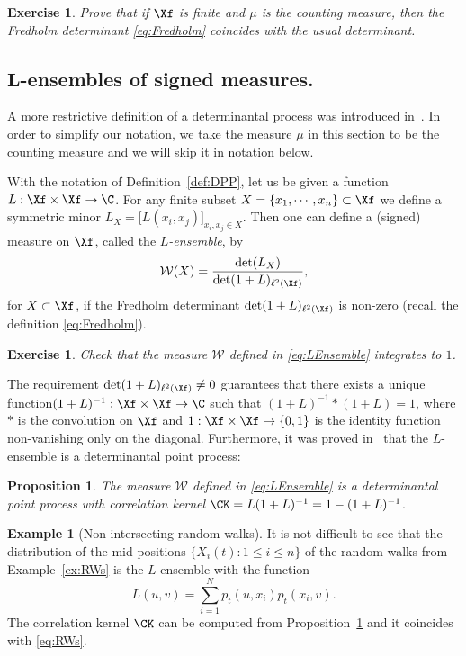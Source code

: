 \documentclass[]{pcmi}
\theoremstyle{plain}
\newtheorem{proposition}[equation]{Proposition}
\newtheorem{exercise}[equation]{Exercise}
\theoremstyle{definition}
\newtheorem{example}[equation]{Example}
\begin{document}
\begin{exercise}
 Prove that if $\Xf$ is finite and $\mu$ is the counting measure, then the Fredholm determinant \eqref{eq:Fredholm} coincides with the usual determinant.
\end{exercise}

\subsection{$\mathbf L$-ensembles of signed measures.}

A more restrictive definition of a determinantal process was introduced in~\cite{borodinRains}. In order to simplify our notation, we take the measure $\mu$ in this section to be the counting measure and we will skip it in notation below.

With the notation of Definition~\ref{def:DPP}, let us be given a function $L:\Xf\times\Xf\to\C$. For any finite subset $X = \{x_1, \cdots, x_n\} \subset \Xf$ we define a symmetric minor $L_X = \bigl[L(x_i,x_j)\bigr]_{x_i,x_j \in X}$. Then one can define a (signed) measure on $\Xf$, called the \emph{$L$-ensemble}, by
\begin{equation}\label{eq:LEnsemble}
\mathcal{W}(X)=\frac{\det(L_X)}{\det(1+L)_{\ell^2(\Xf)}},
\end{equation}
for $X \subset \Xf$, if the Fredholm determinant $\det(1+L)_{\ell^2(\Xf)}$ is non-zero (recall the definition \eqref{eq:Fredholm}).

\begin{exercise}
 Check that the measure $\mathcal{W}$ defined in \eqref{eq:LEnsemble} integrates to $1$.
\end{exercise}

The requirement $\det(1+L)_{\ell^2(\Xf)} \neq 0$ guarantees that there exists a unique function\break$(1+L)^{-1} : \Xf \times \Xf \to \C$ such that $(1+L)^{-1} * (1 + L) = 1$, where $*$ is the convolution on $\Xf$ and $1 : \Xf \times \Xf \to \{0,1\}$ is the identity function non-vanishing only on the diagonal. Furthermore, it was proved in~\cite{Macchi1975} that the $L$-ensemble is a determinantal point process: 

\begin{proposition}\label{prop:Macchi}
The measure $\mathcal{W}$ defined in \eqref{eq:LEnsemble} is a determinantal point process with correlation kernel $\CK=L(1+L)^{-1} = 1 - (1+L)^{-1}$.
\end{proposition}

\begin{example}[Non-intersecting random walks]
It is not difficult to see that the distribution of the mid-positions $\{X_i(t) : 1 \leq i \leq n\}$ of the random walks from Example~\ref{ex:RWs} is the $L$-ensemble with the function 
\[
 	L(u, v) = \sum_{i=1}^N p_t(u, x_i) p_t(x_i, v).
\]
The correlation kernel $\CK$ can be computed from Proposition~\ref{prop:Macchi} and it coincides with \eqref{eq:RWs}.
\end{example}
\end{document}
